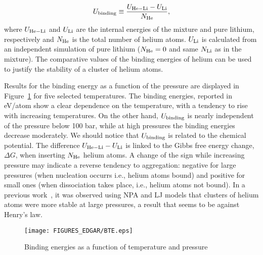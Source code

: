 \documentclass[jcp,amsmath,amssymb,preprint]{revtex4-1}
\begin{document}
\begin{equation} \label{eq_binding}
            U_{\rm binding} \equiv \frac{U_{\rm He-Li} - U_{\rm Li}}{N_{\rm He}},
\end{equation}
where $U_{\rm He-Li} $ and $U_{\rm Li}$ are the internal energies of the mixture and pure lithium, respectively and $N_{\rm He}$ is the total number of helium atoms.  $U_{\rm Li}$ is calculated from an independent simulation of pure lithium ($N_{\rm He} = 0$ and same $N_{\rm Li}$ as in the mixture). The comparative values of the binding energies of helium can be used to justify the stability of a cluster of helium atoms. 

Results for the binding energy as a function of the pressure are displayed in Figure~\ref{fig:BPE_pres} for five selected temperatures.  The binding energies, reported in eV/atom show a clear dependence on the temperature, with a tendency to rise with increasing temperatures. On the other hand,  $U_{\rm binding}$ is nearly independent of the pressure below 100 bar, while at high pressures the binding energies decrease moderately.  We should notice that $ U_{\rm binding}$ is related to the chemical potential\cite{pal1994change}. The difference $U_{\rm He-Li} - U_{\rm Li}$ is linked to the Gibbs free energy change, 
$\Delta G$, when inserting $N_{\rm He}$ helium atoms.  A change of the sign while increasing pressure may indicate a reverse tendency to aggregation: negative for large pressures (when nucleation occurrs i.e., helium atoms bound) and positive for small ones (when dissociation takes place, i.e., helium atoms not bound). In a previous work~\cite{marti2022nucleation}, it was observed using NPA\cite{canales1994computer} and LJ models that clusters of helium atoms were more stable at large pressures, a result that seems to be against Henry's law.

 \begin{figure}
        \centering
        \texttt{[image: FIGURES\_EDGAR/BTE.eps]}
        \caption{Binding energies as a function of temperature and pressure}
        \label{fig:BPE_pres}
    \end{figure}
\end{document}
